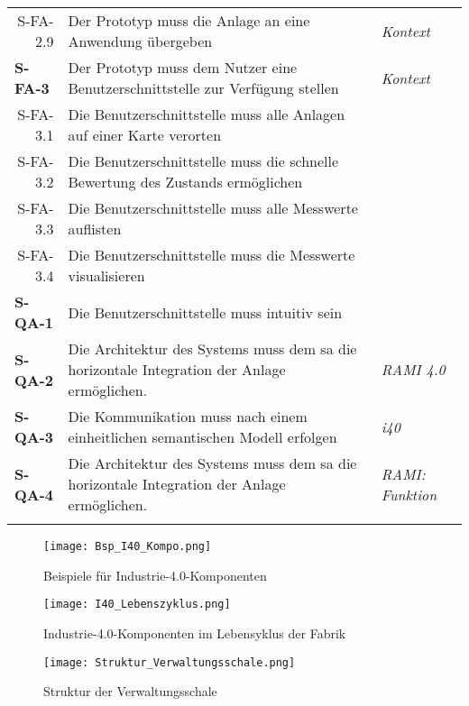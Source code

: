 \begin{tabularx}{\textwidth}{@{}lXp{2cm}@{}}
      \multicolumn{1}{r}{S-FA-2.9} & Der Prototyp muss die Anlage an eine Anwendung übergeben &  \textit{Kontext} \\
      \textbf{S-FA-3}              &  Der Prototyp muss dem Nutzer eine Benutzerschnittstelle zur Verfügung stellen    & \textit{Kontext}  \\
      \multicolumn{1}{r}{S-FA-3.1} &  Die Benutzerschnittstelle muss alle Anlagen auf einer Karte verorten \\
      \multicolumn{1}{r}{S-FA-3.2} &  Die Benutzerschnittstelle muss die schnelle Bewertung des Zustands ermöglichen \\
      \multicolumn{1}{r}{S-FA-3.3} &  Die Benutzerschnittstelle muss alle Messwerte auflisten \\
      \multicolumn{1}{r}{S-FA-3.4} &  Die Benutzerschnittstelle muss die Messwerte visualisieren \\
      \textbf{S-QA-1}              & Die Benutzerschnittstelle muss intuitiv sein   \\
      \textbf{S-QA-2}              & Die Architektur des Systems muss dem \ac{sa} die horizontale Integration der Anlage ermöglichen.   & \textit{RAMI 4.0} \\
      \textbf{S-QA-3}              &  Die Kommunikation muss nach einem einheitlichen semantischen Modell erfolgen  & \textit{\ac{i40}} \\
      \textbf{S-QA-4}              &  Die Architektur des Systems muss dem \ac{sa} die horizontale Integration der Anlage ermöglichen.        & \textit{RAMI: Funktion} \\
      \addlinespace
      \bottomrule
      \caption{Anforderungen aus Systemebene}
  \end{tabularx}



\begin{figure}[h]
  \centering
  \texttt{[image: Bsp\_I40\_Kompo.png]}
  \caption[Beispiele für Industrie-4.0-Komponenten]{Beispiele für Industrie-4.0-Komponenten \citep[S. 54]{BITKOM2015}}
  \label{i40kompo}
\end{figure}

\begin{figure}[h]
  \centering
  \texttt{[image: I40\_Lebenszyklus.png]}
  \caption[Industrie-4.0-Komponenten im Lebensyklus der Fabrik]{Industrie-4.0-Komponenten im Lebensyklus der Fabrik \citep[S. 56]{BITKOM2015}}
  \label{lifecycle}
\end{figure}

\begin{figure}[h]
  \centering
  \texttt{[image: Struktur\_Verwaltungsschale.png]}
  \caption[Struktur der Verwaltungsschale]{Struktur der Verwaltungsschale}
  \label{verwaltungsschale}
\end{figure}

\newpage


